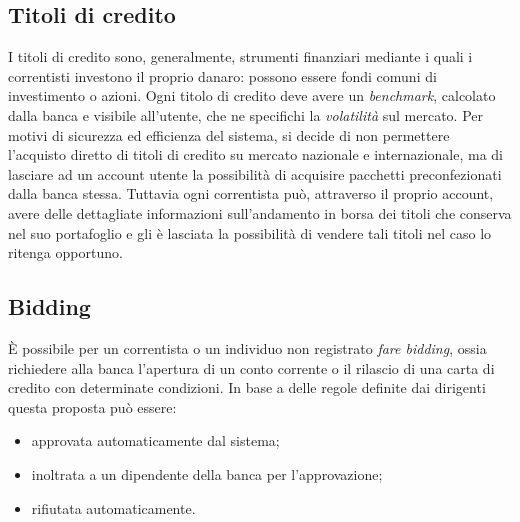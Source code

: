 \subsection{Titoli di credito}

I titoli di credito sono, generalmente, strumenti finanziari mediante i quali i correntisti investono il proprio danaro: possono essere fondi comuni di investimento o azioni.
Ogni titolo di credito deve avere un \emph{benchmark}, calcolato dalla banca e visibile all'utente, che ne specifichi la \emph{volatilità} sul mercato.
Per motivi di sicurezza ed efficienza del sistema, si decide di non permettere l'acquisto diretto di titoli di credito su mercato nazionale e internazionale, ma di lasciare ad un account utente la possibilità di acquisire pacchetti preconfezionati dalla banca stessa.
Tuttavia ogni correntista può, attraverso il proprio account, avere delle dettagliate informazioni sull'andamento in borsa dei titoli che conserva nel suo portafoglio  e gli è lasciata la possibilità di vendere tali titoli nel caso lo ritenga opportuno.

\subsection{Bidding}

\`E possibile per un correntista o un individuo non registrato \emph{fare bidding}, ossia richiedere alla banca l'apertura di un conto corrente o il rilascio di una carta di credito con determinate condizioni.
In base a delle regole definite dai dirigenti questa proposta pu\`o essere:
\begin{itemize}
	\item approvata automaticamente dal sistema;
	\item inoltrata a un dipendente della banca per l'approvazione;
	\item rifiutata automaticamente.
\end{itemize}

